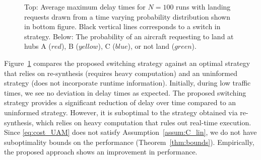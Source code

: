 



\begin{figure}
    \centering
    
    \caption{Top: Average maximum delay times for $N=100$ runs with landing requests drawn from a time varying probability distribution shown in bottom figure. Black vertical lines corresponds to a switch in strategy. Below: The probability of an aircraft requesting to land at hubs A ($red$), B ($yellow$), C ($blue$), or not land ($green$).}
    \label{fig:delay}
\end{figure}



Figure~\ref{fig:delay} compares the proposed switching strategy against an optimal strategy that relies on re-synthesis (requires heavy computation) and an uninformed strategy (does not incorporate runtime information). 
Initially, during low traffic times, we see no deviation in delay times as expected. The proposed switching strategy provides a significant reduction of delay over time compared to an uninformed strategy. However, it is suboptimal to the strategy obtained via re-synthesis, which relies on heavy computation that rules out real-time execution. 
Since \eqref{eq:cost_UAM} does not satisfy Assumption~\ref{assum:C_lin}, we do not have suboptimality bounds on the performance (Theorem~\ref{thm:bounds}). Empirically, the proposed approach shows an improvement in performance.
